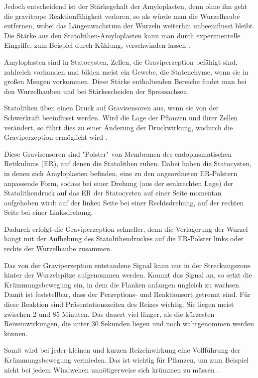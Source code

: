 \documentclass[
a4paper, 
11pt, 
ngerman,
listof=totoc,
bibliography=totocnumbered,
abstracton
]{scrreprt}
\begin{document}
Jedoch entscheidend ist der Stärkegehalt  der Amyloplasten, denn ohne ihn geht die gravitrope Reaktionfähigkeit verloren, so als würde man die Wurzelhaube entfernen, wobei das Längenwachstum der Wurzeln weiterhin unbeeinflusst bleibt. Die Stärke aus den Statolithen-Amyloplasten kann man durch experimentelle Eingriffe, zum Beispiel durch Kühlung, verschwinden lassen \parencite[452]{Strasburger}.

Amyloplasten sind in Statocysten, Zellen, die Graviperzeption befähigt sind, zahlreich vorhanden und bilden meist ein Gewebe, die Statenchyme, wenn sie in großen Mengen vorkommen. Diese Stärke enthaltenden Bereiche findet man bei den Wurzelhauben und bei Stärkescheiden der Sprossachsen.  

Statolithen üben einen Druck auf Gravisensoren aus, wenn sie von der Schwerkraft beeinflusst werden. Wird die Lage der Pflanzen und ihrer Zellen verändert, so führt dies zu einer Änderung der Druckwirkung, wodurch die Graviperzeption ermöglicht wird \parencite[501f]{Nultsch}.

Diese Gravisensoren sind "Polster" von Membranen des endoplasmatischen Retikulums (ER), auf denen die Statolithen ruhen.
Dabei haben die Statocysten, in denen sich Amyloplasten befinden, eine zu den angeordneten ER-Polstern anpassende Form, sodass bei einer Drehung (aus der senkrechten Lage) der Statolithendruck auf das ER der Statocysten auf einer Seite momentan aufgehoben wird: auf der linken Seite bei einer Rechtsdrehung, auf der rechten Seite bei einer Linksdrehung.

Dadurch erfolgt die Graviperzeption schneller, denn die Verlagerung der Wurzel hängt  mit der Aufhebung des Statolithendruckes auf die ER-Polster links oder rechts der Wurzelhaube zusammen. 

Das von der Graviperzeption entstandene Signal kann nur in der Streckungszone hinter der Wurzelspitze aufgenommen werden. Kommt das Signal an, so setzt die Krümmungsbewegung ein, in dem die Flanken anfangen ungleich zu wachsen. Damit ist feststellbar, dass der Perzeptions- und Reaktionsort getrennt sind.
Für diese Reaktion sind Präsentationszeiten des Reizes wichtig. Sie liegen meist zwischen 2 und 85 Minuten. Das dauert viel länger, als die kürzesten Reizeinwirkungen, die unter 30 Sekunden liegen und noch wahrgenommen werden können.

Somit wird bei jeder kleinen und kurzen Reizeinwirkung eine Vollführung der Krümmungsbewegung vermieden. Das ist wichtig für Pflanzen, um zum Beispiel nicht bei jedem Windwehen unnötigerweise  sich krümmen zu müssen \parencite[531]{Luettge}.  
\end{document}
